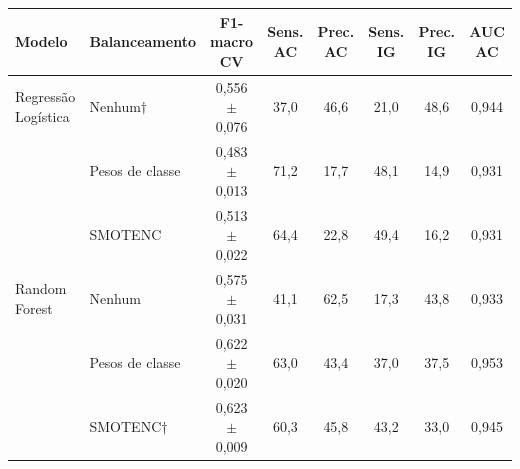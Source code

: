 \begin{tabular}{llcccccc}
\toprule
\textbf{Modelo} & \textbf{Balanceamento} & \textbf{F1-macro CV} & \textbf{Sens. AC} & \textbf{Prec. AC} & \textbf{Sens. IG} & \textbf{Prec. IG} & \textbf{AUC AC} \\
\midrule
Regressão Logística & Nenhum$\dagger$ & 0,556 $\pm$ 0,076 & 37,0 & 46,6 & 21,0 & 48,6 & 0,944 \\
 & Pesos de classe & 0,483 $\pm$ 0,013 & 71,2 & 17,7 & 48,1 & 14,9 & 0,931 \\
 & SMOTENC & 0,513 $\pm$ 0,022 & 64,4 & 22,8 & 49,4 & 16,2 & 0,931 \\
\midrule
Random Forest & Nenhum & 0,575 $\pm$ 0,031 & 41,1 & 62,5 & 17,3 & 43,8 & 0,933 \\
 & Pesos de classe & 0,622 $\pm$ 0,020 & 63,0 & 43,4 & 37,0 & 37,5 & 0,953 \\
 & SMOTENC$\dagger$ & 0,623 $\pm$ 0,009 & 60,3 & 45,8 & 43,2 & 33,0 & 0,945 \\
\bottomrule
\end{tabular}
